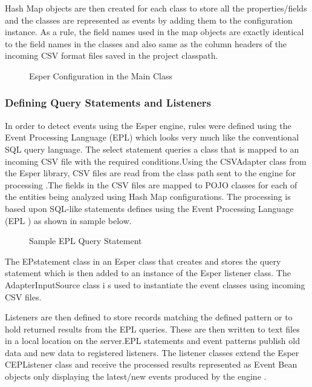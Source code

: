 \noindent Hash Map objects are then created for each class to store all the properties/fields and the classes are represented as events by adding them to the configuration instance. As a rule, the field names used in the map objects are exactly identical to the field names in the classes and also same as the column headers of the incoming CSV format files saved in the project classpath.

\begin{center}
\begin{figure}[h]
\caption{Esper Configuration in the Main Class}

\end{figure}
\end{center}


\subsubsection{Defining Query Statements and Listeners }

\noindent In order to detect events using the Esper engine, rules were defined using the Event Processing Language (EPL) which looks very much like the conventional SQL query language. The select statement queries a class that is mapped to an incoming CSV file with the required conditions.Using the CSVAdapter  class from the Esper \cite{twentyfive} library, CSV files are read from the class path sent to the engine for processing .The fields in the CSV files are mapped to POJO classes for each of the entities being  analyzed using Hash Map configurations. The processing is based upon SQL-like statements defines using the Event Processing Language (EPL ) \cite{four} as shown in sample below.

\begin{center}
\begin{figure}[h]
\caption{Sample EPL Query Statement }

\end{figure}
\end{center}

\noindent The EPstatement class in an Esper class that creates and stores the query statement which is then added to an instance of the Esper listener class. The AdapterInputSource class i s used to instantiate the event classes using incoming CSV files.


\noindent Listeners are then defined  to store records  matching the defined pattern or  to hold returned results from the EPL queries. These are then written to text files in a local location on the server.EPL statements and event patterns publish old data and new data to registered listeners. The listener classes extend the Esper CEPListener class and receive the processed results represented as Event Bean objects only displaying the latest/new events produced by the engine \cite{twentyfive}. 

